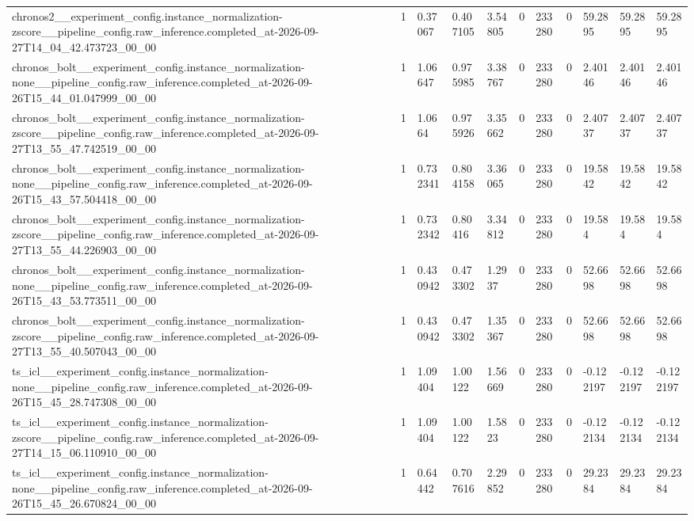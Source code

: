 \begin{tabular}{lllllllllll}
chronos2\_\_experiment\_config.instance\_normalization-zscore\_\_pipeline\_config.raw\_inference.completed\_at-2026-09-27T14\_04\_42.473723\_00\_00 & 1 & 0.37067 & 0.407105 & 3.54805 & 0 & 233280 & 0 & 59.2895 & 59.2895 & 59.2895 \\
chronos\_bolt\_\_experiment\_config.instance\_normalization-none\_\_pipeline\_config.raw\_inference.completed\_at-2026-09-26T15\_44\_01.047999\_00\_00 & 1 & 1.06647 & 0.975985 & 3.38767 & 0 & 233280 & 0 & 2.40146 & 2.40146 & 2.40146 \\
chronos\_bolt\_\_experiment\_config.instance\_normalization-zscore\_\_pipeline\_config.raw\_inference.completed\_at-2026-09-27T13\_55\_47.742519\_00\_00 & 1 & 1.0664 & 0.975926 & 3.35662 & 0 & 233280 & 0 & 2.40737 & 2.40737 & 2.40737 \\
chronos\_bolt\_\_experiment\_config.instance\_normalization-none\_\_pipeline\_config.raw\_inference.completed\_at-2026-09-26T15\_43\_57.504418\_00\_00 & 1 & 0.732341 & 0.804158 & 3.36065 & 0 & 233280 & 0 & 19.5842 & 19.5842 & 19.5842 \\
chronos\_bolt\_\_experiment\_config.instance\_normalization-zscore\_\_pipeline\_config.raw\_inference.completed\_at-2026-09-27T13\_55\_44.226903\_00\_00 & 1 & 0.732342 & 0.80416 & 3.34812 & 0 & 233280 & 0 & 19.584 & 19.584 & 19.584 \\
chronos\_bolt\_\_experiment\_config.instance\_normalization-none\_\_pipeline\_config.raw\_inference.completed\_at-2026-09-26T15\_43\_53.773511\_00\_00 & 1 & 0.430942 & 0.473302 & 1.2937 & 0 & 233280 & 0 & 52.6698 & 52.6698 & 52.6698 \\
chronos\_bolt\_\_experiment\_config.instance\_normalization-zscore\_\_pipeline\_config.raw\_inference.completed\_at-2026-09-27T13\_55\_40.507043\_00\_00 & 1 & 0.430942 & 0.473302 & 1.35367 & 0 & 233280 & 0 & 52.6698 & 52.6698 & 52.6698 \\
ts\_icl\_\_experiment\_config.instance\_normalization-none\_\_pipeline\_config.raw\_inference.completed\_at-2026-09-26T15\_45\_28.747308\_00\_00 & 1 & 1.09404 & 1.00122 & 1.56669 & 0 & 233280 & 0 & -0.122197 & -0.122197 & -0.122197 \\
ts\_icl\_\_experiment\_config.instance\_normalization-zscore\_\_pipeline\_config.raw\_inference.completed\_at-2026-09-27T14\_15\_06.110910\_00\_00 & 1 & 1.09404 & 1.00122 & 1.5823 & 0 & 233280 & 0 & -0.122134 & -0.122134 & -0.122134 \\
ts\_icl\_\_experiment\_config.instance\_normalization-none\_\_pipeline\_config.raw\_inference.completed\_at-2026-09-26T15\_45\_26.670824\_00\_00 & 1 & 0.64442 & 0.707616 & 2.29852 & 0 & 233280 & 0 & 29.2384 & 29.2384 & 29.2384 \\

\end{tabular}
